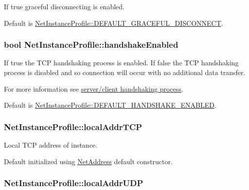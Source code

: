 If true graceful disconnecting is enabled. 

Default is \hyperlink{class_net_instance_profile_ada7dfa96aa2fd6c205dc1137f2aad30d}{NetInstanceProfile::DEFAULT\_\-GRACEFUL\_\-DISCONNECT}. \hypertarget{class_net_instance_profile_aaeba0fb41f3972711b0d789d13d74c0f}{
\subsubsection[{handshakeEnabled}]{\setlength{\rightskip}{0pt plus 5cm}bool {\bf NetInstanceProfile::handshakeEnabled}}}
\label{class_net_instance_profile_aaeba0fb41f3972711b0d789d13d74c0f}


If true the TCP handshaking process is enabled. If false the TCP handshaking process is disabled and so connection will occur with no additional data transfer. 

For more information see \hyperlink{handshake_page}{server/client handshaking process}.\par
\par


Default is \hyperlink{class_net_instance_profile_a28c3283c29676e4dfbc7ea2428df32b5}{NetInstanceProfile::DEFAULT\_\-HANDSHAKE\_\-ENABLED}. \hypertarget{class_net_instance_profile_ad8c7a728119a1e74e44fdbeb9dba3392}{
\subsubsection[{localAddrTCP}]{ {\bf NetInstanceProfile::localAddrTCP}}}
\label{class_net_instance_profile_ad8c7a728119a1e74e44fdbeb9dba3392}


Local TCP address of instance. 

Default initialized using \hyperlink{class_net_address}{NetAddress} default constructor. \hypertarget{class_net_instance_profile_ad68155dc7f50c06688b8adae226626eb}{
\subsubsection[{localAddrUDP}]{ {\bf NetInstanceProfile::localAddrUDP}}}
\label{class_net_instance_profile_ad68155dc7f50c06688b8adae226626eb}


